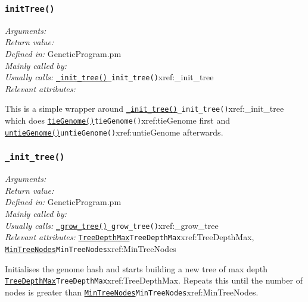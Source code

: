 \documentclass[a4paper]{article}
\begin{document}
\subsubsection{\texttt{initTree()}}\label{xref:initTree}
\begin{flushleft}
\textit{Arguments:} \\
\textit{Return value:} \\
\textit{Defined in:} GeneticProgram.pm\\
\textit{Mainly called by:} \\
\textit{Usually calls:} \hyperref[no]{\texttt{\_init\_tree()}}{\texttt{\_init\_tree()}}{xref:_init_tree}\\
\textit{Relevant attributes:}
\end{flushleft}

This is a simple wrapper around \hyperref[no]{\texttt{\_init\_tree()}}{\texttt{\_init\_tree()}}{xref:_init_tree} which does
\hyperref[no]{\texttt{tieGenome()}}{\texttt{tieGenome()}}{xref:tieGenome} first and \hyperref[no]{\texttt{untieGenome()}}{\texttt{untieGenome()}}{xref:untieGenome} afterwards.

\subsubsection{\texttt{\_init\_tree()}}\label{xref:_init_tree}
\begin{flushleft}
\textit{Arguments:} \\
\textit{Return value:} \\
\textit{Defined in:} GeneticProgram.pm\\
\textit{Mainly called by:} \\
\textit{Usually calls:} \hyperref[no]{\texttt{\_grow\_tree()}}{\texttt{\_grow\_tree()}}{xref:_grow_tree}\\
\textit{Relevant attributes:} \hyperref[no]{\texttt{TreeDepthMax}}{\texttt{TreeDepthMax}}{xref:TreeDepthMax}, \hyperref[no]{\texttt{MinTreeNodes}}{\texttt{MinTreeNodes}}{xref:MinTreeNodes}
\end{flushleft}

Initialises the genome hash and starts building a new tree of max
depth \hyperref[no]{\texttt{TreeDepthMax}}{\texttt{TreeDepthMax}}{xref:TreeDepthMax}.  Repeats this until the number of nodes
is greater than \hyperref[no]{\texttt{MinTreeNodes}}{\texttt{MinTreeNodes}}{xref:MinTreeNodes}.
\end{document}
